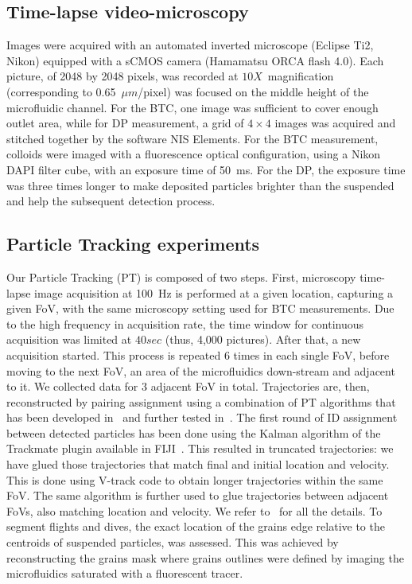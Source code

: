 \documentclass[singlecolumn,pre,notitlepage,preprintnumbers,floatfix,superscriptaddress]{revtex4-1}
\begin{document}
\subsection*{Time-lapse video-microscopy} 
\noindent
Images were acquired with an automated inverted microscope (Eclipse Ti2, Nikon) equipped with a sCMOS camera (Hamamatsu ORCA flash 4.0). Each picture, of 2048 by 2048 pixels, was recorded at $10X$~magnification (corresponding to 0.65~$\mu m$/pixel) was focused on the middle height of the microfluidic channel. For the BTC, one image was sufficient to cover enough outlet area, while for DP measurement, a grid of $4 \times 4$ images was acquired and stitched together by the software NIS Elements. For the BTC measurement, colloids were imaged with a fluorescence optical configuration, using a Nikon DAPI filter cube, with an exposure time of 50~ms. For the DP, the exposure time was three times longer to make deposited particles brighter than the suspended and help the subsequent detection process.\\

\subsection*{Particle Tracking experiments} 
\noindent
Our Particle Tracking (PT) is composed of two steps. First, microscopy time-lapse image acquisition at 100~Hz is performed at a given location, capturing a given FoV, with the same microscopy setting used for BTC measurements. Due to the high frequency in acquisition rate, the time window for continuous acquisition was limited at $40 sec$ (thus, 4,000 pictures). After that, a new acquisition started. This process is repeated 6 times in each single FoV, before moving to the next FoV, an area of the microfluidics down-stream and adjacent to it. We collected data for 3 adjacent FoV in total. Trajectories are, then, reconstructed by pairing assignment using a combination of PT algorithms that has been developed in~\cite{morales_stochastic_2017} and further tested in~\cite{berghouse_PT_SciRep2024}. The first round of ID assignment between detected particles has been done using the Kalman algorithm of the Trackmate plugin available in FIJI~\cite{schneider_nih_2012}. This resulted in truncated trajectories: we have glued those trajectories that match final and initial location and velocity. This is done using V-track code to obtain longer trajectories within the same FoV. The same algorithm is further used to glue trajectories between adjacent FoVs, also matching location and velocity. We refer to~\cite{berghouse_PT_SciRep2024} for all the details. To segment flights and dives, the exact location of the grains edge relative to the centroids of suspended particles, was assessed. This was achieved by reconstructing the grains mask where grains outlines were defined by imaging the microfluidics saturated with a fluorescent tracer.\\
\end{document}
